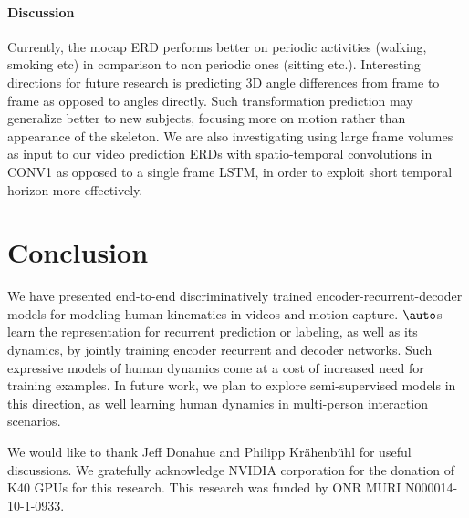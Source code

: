 \documentclass[10pt,twocolumn,letterpaper]{article}
\begin{document}
\paragraph{Discussion}
Currently, the mocap ERD performs  better on periodic activities (walking, smoking etc) in comparison to non periodic ones (sitting etc.).  Interesting directions for future research is predicting 3D angle differences from frame to frame as opposed to angles directly. Such transformation prediction may generalize better to new subjects, focusing more on  motion rather than  appearance of the skeleton. We are also investigating using large frame volumes as input to our video prediction ERDs with spatio-temporal convolutions in CONV1 as opposed to a single frame LSTM, in order to exploit short temporal horizon more effectively. 
    \section{Conclusion}%
We have presented end-to-end  discriminatively trained encoder-recurrent-decoder models for modeling human kinematics in videos and motion capture. $\auto$s   learn the representation for recurrent prediction or labeling, as well as its dynamics, by jointly training encoder recurrent and decoder networks. 
Such expressive models of human dynamics come at a cost of increased need for training examples. In future work, we plan to explore semi-supervised models in this direction, as well learning human dynamics   in multi-person interaction scenarios.   

We would like to thank Jeff Donahue and Philipp Kr\"ahenb\"uhl for useful discussions. 
We  gratefully acknowledge NVIDIA corporation for the donation of K40 GPUs for this research. This research was funded by ONR MURI N000014-10-1-0933.
 




{\small


}
\end{document}

